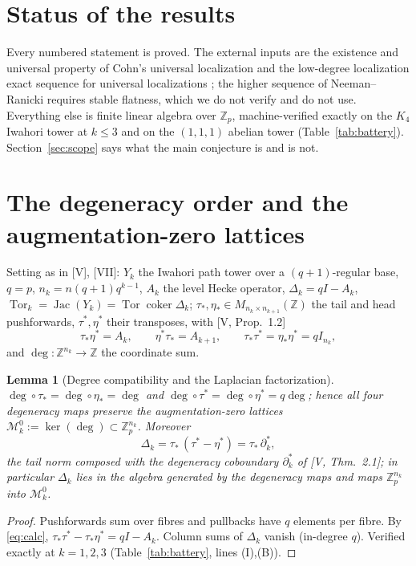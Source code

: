 \documentclass[11pt]{amsart}
\numberwithin{equation}{section}
\newtheorem{lemma}[theorem]{Lemma}
\theoremstyle{definition}
\theoremstyle{remark}
\newcommand{\Z}{\mathbb{Z}}
\newcommand{\Zp}{\Z_p}
\newcommand{\cM}{\mathcal{M}}
\newcommand{\Jac}{\operatorname{Jac}}
\newcommand{\coker}{\operatorname{coker}}
\newcommand{\Tor}{\operatorname{Tor}}
\newcommand{\ta}{\tau_*}
\newcommand{\taup}{\tau^*}
\newcommand{\et}{\eta_*}
\newcommand{\etp}{\eta^*}
\begin{document}
\section*{Status of the results}

Every numbered statement is proved. The external inputs are the existence and universal
property of Cohn's universal localization \cite{Co} and the low-degree localization exact
sequence for universal localizations \cite[Ch.~4]{Sch}; the higher sequence of
Neeman--Ranicki \cite{NR} requires stable flatness, which we do not verify and do not use.
Everything else is finite linear algebra over $\Zp$, machine-verified exactly on the $K_4$
Iwahori tower at $k\le3$ and on the $(1,1,1)$ abelian tower (Table~\ref{tab:battery}).
Section~\ref{sec:scope} says what the main conjecture is and is not.

\section{The degeneracy order and the augmentation-zero lattices}\label{sec:order}

Setting as in [V], [VII]: $Y_k$ the Iwahori path tower over a $(q{+}1)$-regular base,
$q=p$, $n_k=n(q{+}1)q^{k-1}$, $A_k$ the level Hecke operator, $\Delta_k=qI-A_k$,
$\Tor_k=\Jac(Y_k)=\Tor\coker\Delta_k$; $\ta,\et\in M_{n_k\times n_{k+1}}(\Z)$ the tail and head
pushforwards, $\taup,\etp$ their transposes, with [V, Prop.~1.2]
\begin{equation}\label{eq:calc}
\ta\etp=A_k,\qquad \etp\ta=A_{k+1},\qquad \ta\taup=\et\etp=qI_{n_k},
\end{equation}
and $\deg\colon\Z^{n_k}\to\Z$ the coordinate sum.

\begin{lemma}[Degree compatibility and the Laplacian factorization]\label{lem:deg}
$\deg\circ\ta=\deg\circ\et=\deg$ and $\deg\circ\taup=\deg\circ\etp=q\deg$; hence all four
degeneracy maps preserve the augmentation-zero lattices $\cM^{0}_k:=\ker(\deg)\subset\Zp^{n_k}$.
Moreover
\[
\Delta_k=\ta\,(\taup-\etp)=\ta\,\partial_k^{*},
\]
the tail norm composed with the degeneracy coboundary $\partial_k^{*}$ of {\rm[V, Thm.~2.1]};
in particular $\Delta_k$ lies in the algebra generated by the degeneracy maps and maps
$\Zp^{n_k}$ into $\cM^{0}_k$.
\end{lemma}

\begin{proof}
Pushforwards sum over fibres and pullbacks have $q$ elements per fibre. By \eqref{eq:calc},
$\ta\taup-\ta\etp=qI-A_k$. Column sums of $\Delta_k$ vanish (in-degree $q$). Verified exactly
at $k=1,2,3$ (Table~\ref{tab:battery}, lines (I),(B)).
\end{proof}
\end{document}

